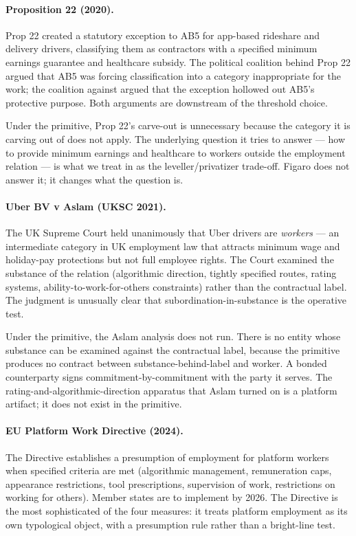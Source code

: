 \documentclass[11pt,a4paper]{article}
\theoremstyle{remark}
\begin{document}
\paragraph{Proposition 22 (2020).}
Prop 22 created a statutory exception to AB5 for app-based
rideshare and delivery drivers, classifying them as contractors
with a specified minimum earnings guarantee and healthcare subsidy.
The political coalition behind Prop 22 argued that AB5 was forcing
classification into a category inappropriate for the work; the
coalition against argued that the exception hollowed out AB5's
protective purpose. Both arguments are downstream of the threshold
choice.

Under the primitive, Prop 22's carve-out is unnecessary because
the category it is carving out of does not apply. The underlying
question it tries to answer --- how to provide minimum earnings
and healthcare to workers outside the employment relation --- is
what we treat in  as the leveller/privatizer
trade-off. Figaro does not answer it; it changes what the question
is.

\paragraph{Uber BV v Aslam (UKSC 2021).}
The UK Supreme Court held unanimously that Uber drivers are
\emph{workers} --- an intermediate category in UK employment law
that attracts minimum wage and holiday-pay protections but not
full employee rights. The Court examined the substance of the
relation (algorithmic direction, tightly specified routes, rating
systems, ability-to-work-for-others constraints) rather than the
contractual label. The judgment is unusually clear that
subordination-in-substance is the operative test.

Under the primitive, the Aslam analysis does not run. There is no
entity whose substance can be examined against the contractual
label, because the primitive produces no contract between
substance-behind-label and worker. A bonded counterparty signs
commitment-by-commitment with the party it serves. The
rating-and-algorithmic-direction apparatus that Aslam turned on
is a platform artifact; it does not exist in the primitive.

\paragraph{EU Platform Work Directive (2024).}
The Directive establishes a presumption of employment for platform
workers when specified criteria are met (algorithmic management,
remuneration caps, appearance restrictions, tool prescriptions,
supervision of work, restrictions on working for others). Member
states are to implement by 2026. The Directive is the most
sophisticated of the four measures: it treats platform employment
as its own typological object, with a presumption rule rather than
a bright-line test.
\end{document}
